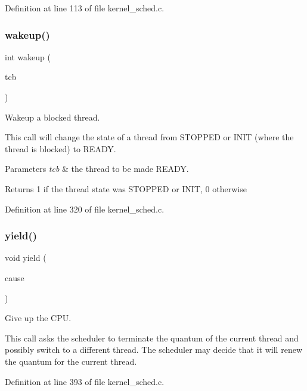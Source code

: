 Definition at line 113 of file kernel\+\_\+sched.\+c.

\mbox{\label{group__scheduler_gae8301452fd9ae5bf7cd7f2676650ff06}} 
\subsubsection{\texorpdfstring{wakeup()}{wakeup()}}
{\footnotesize\ttfamily int wakeup (\begin{DoxyParamCaption}\item[{\hyperlink{group__scheduler_gaf88d9c946bf70b36a1e8bc34383abfc9}{T\+CB} $\ast$}]{tcb }\end{DoxyParamCaption})}



Wakeup a blocked thread. 

This call will change the state of a thread from {\ttfamily S\+T\+O\+P\+P\+ED} or {\ttfamily I\+N\+IT} (where the thread is blocked) to {\ttfamily R\+E\+A\+DY}.


\begin{DoxyParams}{Parameters}
{\em tcb} & the thread to be made {\ttfamily R\+E\+A\+DY}. \\
\hline
\end{DoxyParams}
\begin{DoxyReturn}{Returns}
1 if the thread state was {\ttfamily S\+T\+O\+P\+P\+ED} or {\ttfamily I\+N\+IT}, 0 otherwise 
\end{DoxyReturn}


Definition at line 320 of file kernel\+\_\+sched.\+c.

\mbox{\label{group__scheduler_ga1db327892199949812ae5a52119f2e97}} 
\subsubsection{\texorpdfstring{yield()}{yield()}}
{\footnotesize\ttfamily void yield (\begin{DoxyParamCaption}\item[{enum \hyperlink{group__scheduler_gaad787d8d80312ffca3c0f197b3a25fbe}{S\+C\+H\+E\+D\+\_\+\+C\+A\+U\+SE}}]{cause }\end{DoxyParamCaption})}



Give up the C\+PU. 

This call asks the scheduler to terminate the quantum of the current thread and possibly switch to a different thread. The scheduler may decide that it will renew the quantum for the current thread. 

Definition at line 393 of file kernel\+\_\+sched.\+c.

